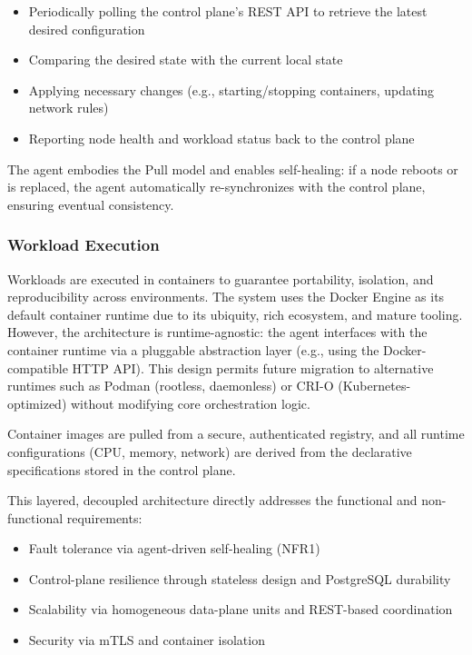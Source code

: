 \begin{itemize}
    \item Periodically polling the control plane’s REST API to retrieve the latest desired configuration
    \item Comparing the desired state with the current local state
    \item Applying necessary changes (e.g., starting/stopping containers, updating network rules)
    \item Reporting node health and workload status back to the control plane
\end{itemize}

The agent embodies the Pull model and enables self-healing: if a node reboots or is replaced, the agent automatically re-synchronizes with the control plane, ensuring eventual consistency.

\subsubsection{Workload Execution}
Workloads are executed in containers to guarantee portability, isolation, and reproducibility across environments. The system uses the Docker Engine as its default container runtime due to its ubiquity, rich ecosystem, and mature tooling. However, the architecture is runtime-agnostic: the agent interfaces with the container runtime via a pluggable abstraction layer (e.g., using the Docker-compatible HTTP API). This design permits future migration to alternative runtimes such as Podman (rootless, daemonless) or CRI-O (Kubernetes-optimized) without modifying core orchestration logic.

Container images are pulled from a secure, authenticated registry, and all runtime configurations (CPU, memory, network) are derived from the declarative specifications stored in the control plane.

This layered, decoupled architecture directly addresses the functional and non-functional requirements:

\begin{itemize}
    \item Fault tolerance via agent-driven self-healing (NFR1)
    \item Control-plane resilience through stateless design and PostgreSQL durability
    \item Scalability via homogeneous data-plane units and REST-based coordination
    \item Security via mTLS and container isolation
\end{itemize}


